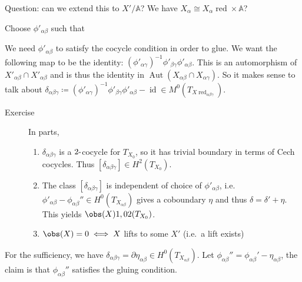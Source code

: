 Question: can we extend this to \(X'/{\mathbb{A}}\)? We have
\(X_\alpha \cong X_\alpha\operatorname{red}\times{\mathbb{A}}\)?

Choose \(\phi'_{\alpha\beta}\) such that

\begin{center}
\end{center}

We need \(\phi'_{\alpha\beta}\) to satisfy the cocycle condition in
order to glue. We want the following map to be the identity:
\((\phi'_{\alpha\gamma})^{-1}\phi'_{\beta\gamma} \phi'_{\alpha\beta}\).
This is an automorphism of \(X'_{\alpha\beta} \cap X'_{\alpha\beta}\)
and is thus the identity in
\(\operatorname{Aut}(X_{\alpha\beta} \cap X_{\alpha\gamma})\). So it
makes sense to talk about
\(\delta_{\alpha\beta\gamma} \coloneqq(\phi'_{\alpha\gamma})^{-1}\phi'_{\beta\gamma} \phi'_{\alpha\beta} - \operatorname{id}\in M^0(T_{X\operatorname{red}_{\alpha\beta\gamma}})\).

\begin{description}
\item[Exercise]
In parts,

\begin{enumerate}
\def\labelenumi{\arabic{enumi}.}
\tightlist
\item
  \(\delta_{\alpha\beta\gamma}\) is a \(2{\hbox{-}}\)cocycle for
  \(T_{X_0}\), so it has trivial boundary in terms of Cech cocycles.
  Thus \([\delta_{\alpha\beta\gamma}] \in H^2(T_{X_0})\).
\item
  The class \([\delta_{\alpha\beta\gamma}]\) is independent of choice of
  \(\phi'_{\alpha\beta}\),
  i.e.~\(\phi'_{\alpha\beta} - \phi_{\alpha\beta}'' \in H^0(T_X_{\alpha\beta})\)
  gives a coboundary \(\eta\) and thus \(\delta = \delta' + \eta\). This
  yields \(\obs(X) \in H^2(T_{X_0})\).
\item
  \(\obs(X) = 0 \iff X\) lifts to some \(X'\) (i.e.~a lift exists)
\end{enumerate}
\end{description}

For the sufficiency, we have
\(\delta_{\alpha\beta\gamma} = {{\partial}}\eta_{\alpha\beta} \in H^0(T_{X_{\alpha\beta}})\).
Let \(\phi_{\alpha\beta}'' = \phi_{\alpha\beta}' - \eta_{\alpha\beta}\),
the claim is that \(\phi_{\alpha\beta}''\) satisfies the gluing
condition.

